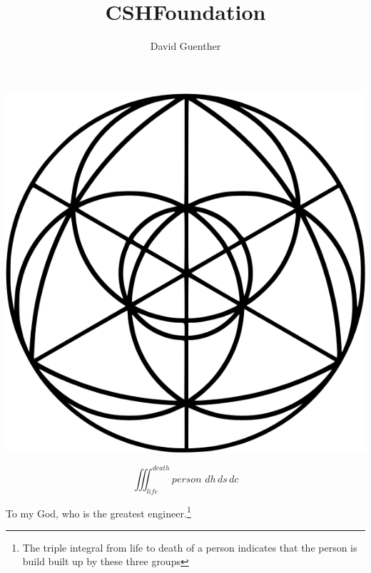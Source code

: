 \documentclass[10pt,a4paper]{book}
\author{David Guenther}
\title{CSHFoundation}
\begin{document}
\maketitle
\centerline{\includegraphics[scale=0.5]{6-logo.png}}

\begin{Huge}
$$\iiint_{life}^{death} person \,\, dh \, ds \, dc$$ \newline
\end{Huge}
\begin{Large}
To my God, who is the greatest engineer.\footnote{The triple integral from life to death of a person indicates that the person is build built up by these three groups}
\end{Large}

\tableofcontents
\vspace*{\fill}








\end{document}
